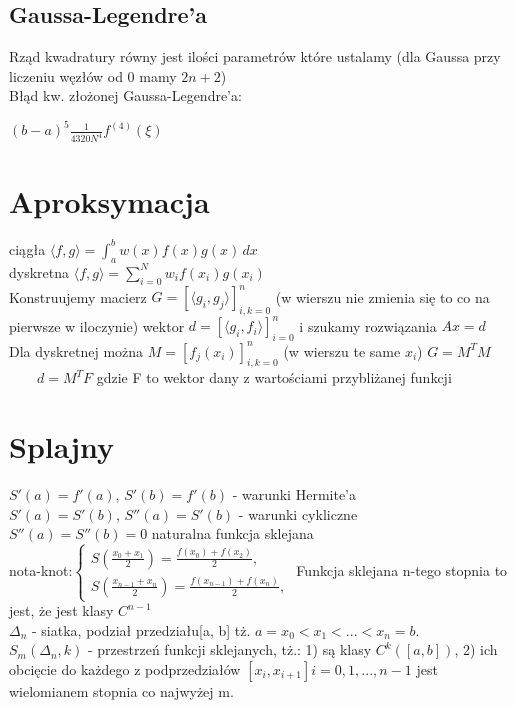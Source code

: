 \documentclass[twocolumn]{article}
\begin{document}
\begin{flushleft}
\subsection{Gaussa-Legendre’a}
Rząd kwadratury równy jest ilości parametrów które ustalamy (dla Gaussa przy liczeniu węzłów od 0 mamy $2n+2$)\\
Błąd kw. złożonej Gaussa-Legendre’a:\\
\begin{center}
$(b-a)^5\frac{1}{4320N^4}f^{(4)}(\xi)$
\end{center}
\section{Aproksymacja}
ciągła $\langle f,g \rangle = \int_a^b w(x)f(x)g(x) \,dx$\\
dyskretna $\langle f,g \rangle = \sum_{i=0}^Nw_if(x_i)g(x_i)$\\\vspace{3mm}
Konstruujemy macierz $G = \left[\langle g_i,g_j \rangle\right]_{i,k = 0}^n$ (w wierszu nie zmienia się to co na pierwsze w iloczynie) wektor $d = \left[\langle g_i, f_i\rangle \right]_{i = 0}^n$ i szukamy rozwiązania $Ax=d$\\
Dla dyskretnej można $M = \left[f_j(x_i)\right]_{i,k = 0}^n$ (w wierszu te same $x_i$) $G = M^TM$ \ \ \ \  $d = M^TF$ gdzie F to wektor dany z wartościami przybliżanej funkcji
\section{Splajny}
$S'(a)=f'(a)$, $S'(b)=f'(b)$ - warunki Hermite'a\\
$S'(a)=S'(b)$, $S''(a)=S'(b)$ - warunki cykliczne\\
$S''(a)=S''(b)=0$ naturalna funkcja sklejana\\
nota-knot:$
\begin{cases}
    S(\frac{x_0+x_1}{2})=\frac{f(x_0)+f(x_2)}{2}, \\
    S(\frac{x_{n-1}+x_n}{2})=\frac{f(x_{n-1})+f(x_n)}{2},
\end{cases}$
Funkcja sklejana n-tego stopnia to jest, że jest klasy $C^{n-1}$\\
$\Delta_n $ - siatka, podział przedziału[a, b] tż. $a = x_0 < x_1 < ... < x_n = b$.\\
$S_m(\Delta_n, k)$ - przestrzeń funkcji sklejanych, tż.: 1) są klasy $C^k([a, b])$, 2) ich obcięcie do każdego z podprzedziałów $[x_i, x_{i+1}] i = 0, 1, ..., n-1$ jest wielomianem stopnia co najwyżej m.\\

\end{flushleft}
\end{document}
